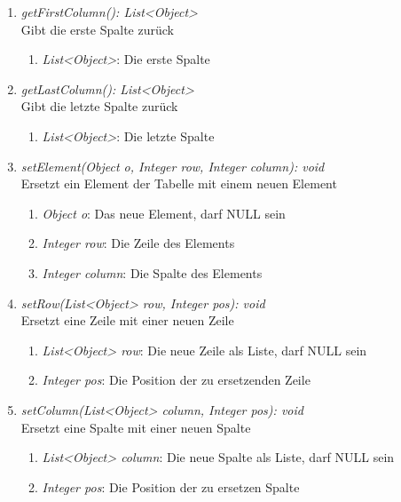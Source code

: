 \begin{enumerate}[+]
	\item \textit{getFirstColumn(): List<Object>} \\
	Gibt die erste Spalte zurück
	\vspace{-0.2cm}
	\begin{enumerate}[$\circ$]
		\item \textit{List<Object>}: Die erste Spalte
	\end{enumerate}
	
	\item \textit{getLastColumn(): List<Object>} \\
	Gibt die letzte Spalte zurück
	\vspace{-0.2cm}
	\begin{enumerate}[$\circ$]
		\item \textit{List<Object>}: Die letzte Spalte
	\end{enumerate}
	
	\item \textit{setElement(Object o, Integer row, Integer column): void} \\
	Ersetzt ein Element der Tabelle mit einem neuen Element
	\begin{enumerate}[$\bullet$]
		\item \textit{Object o}: Das neue Element, darf NULL sein
		\item \textit{Integer row}: Die Zeile des Elements
		\item \textit{Integer column}: Die Spalte des Elements
	\end{enumerate}
	\vspace{-0.2cm}
	
	\item \textit{setRow(List<Object> row, Integer pos): void} \\
	Ersetzt eine Zeile mit einer neuen Zeile
	\begin{enumerate}[$\bullet$]
		\item \textit{List<Object> row}: Die neue Zeile als Liste, darf NULL sein
		\item \textit{Integer pos}: Die Position der zu ersetzenden Zeile
	\end{enumerate}
	\vspace{-0.2cm}
	
	\item \textit{setColumn(List<Object> column, Integer pos): void} \\
	Ersetzt eine Spalte mit einer neuen Spalte
	\begin{enumerate}[$\bullet$]
		\item \textit{List<Object> column}: Die neue Spalte als Liste, darf NULL sein
		\item \textit{Integer pos}: Die Position der zu ersetzen Spalte
	\end{enumerate}
	\vspace{-0.2cm}
	

\end{enumerate}
